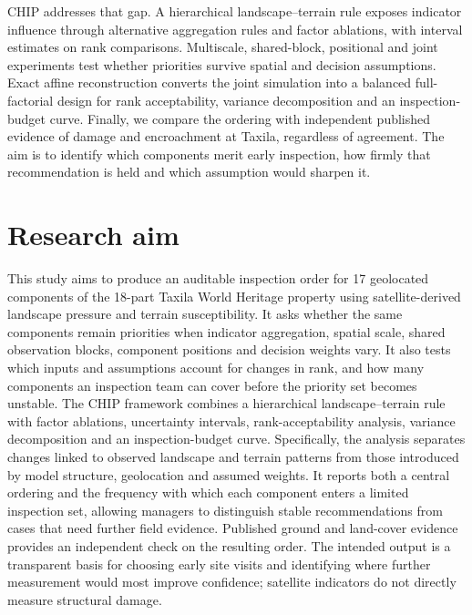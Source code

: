CHIP addresses that gap. A hierarchical landscape--terrain rule exposes indicator influence through alternative aggregation rules and factor ablations, with interval estimates on rank comparisons. Multiscale, shared-block, positional and joint experiments test whether priorities survive spatial and decision assumptions. Exact affine reconstruction converts the joint simulation into a balanced full-factorial design for rank acceptability, variance decomposition and an inspection-budget curve. Finally, we compare the ordering with independent published evidence of damage and encroachment at Taxila, regardless of agreement. The aim is to identify which components merit early inspection, how firmly that recommendation is held and which assumption would sharpen it.


\section{Research aim}
This study aims to produce an auditable inspection order for 17 geolocated components of the 18-part Taxila World Heritage property using satellite-derived landscape pressure and terrain susceptibility. It asks whether the same components remain priorities when indicator aggregation, spatial scale, shared observation blocks, component positions and decision weights vary. It also tests which inputs and assumptions account for changes in rank, and how many components an inspection team can cover before the priority set becomes unstable. The CHIP framework combines a hierarchical landscape--terrain rule with factor ablations, uncertainty intervals, rank-acceptability analysis, variance decomposition and an inspection-budget curve. Specifically, the analysis separates changes linked to observed landscape and terrain patterns from those introduced by model structure, geolocation and assumed weights. It reports both a central ordering and the frequency with which each component enters a limited inspection set, allowing managers to distinguish stable recommendations from cases that need further field evidence. Published ground and land-cover evidence provides an independent check on the resulting order. The intended output is a transparent basis for choosing early site visits and identifying where further measurement would most improve confidence; satellite indicators do not directly measure structural damage.
